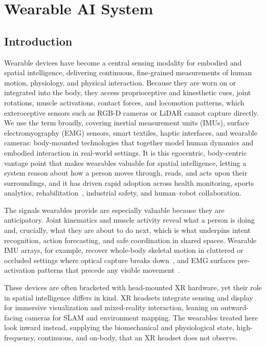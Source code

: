 
\section{Wearable AI System}
\label{sec:p4_s9_3}


\subsection{Introduction}
\label{subsec:p4-sec9-3-introduction}

Wearable devices have become a central sensing modality for embodied and spatial intelligence, delivering continuous, fine-grained measurements of human motion, physiology, and physical interaction. Because they are worn on or integrated into the body, they access proprioceptive and kinesthetic cues, joint rotations, muscle activations, contact forces, and locomotion patterns, which exteroceptive sensors such as RGB-D cameras or LiDAR cannot capture directly. We use the term broadly, covering inertial measurement units (IMUs), surface electromyography (EMG) sensors, smart textiles, haptic interfaces, and wearable cameras: body-mounted technologies that together model human dynamics and embodied interaction in real-world settings. It is this egocentric, body-centric vantage point that makes wearables valuable for spatial intelligence, letting a system reason about how a person moves through, reads, and acts upon their surroundings, and it has driven rapid adoption across health monitoring, sports analytics, rehabilitation~\cite{patel2012review}, industrial safety, and human--robot collaboration.

The signals wearables provide are especially valuable because they are anticipatory. Joint kinematics and muscle activity reveal what a person is doing and, crucially, what they are about to do next, which is what underpins intent recognition, action forecasting, and safe coordination in shared spaces. Wearable IMU arrays, for example, recover whole-body skeletal motion in cluttered or occluded settings where optical capture breaks down~\cite{huang2018dip, vonmarcard2017sparse}, and EMG surfaces pre-activation patterns that precede any visible movement~\cite{atzori2014ninapro}.

These devices are often bracketed with head-mounted XR hardware, yet their role in spatial intelligence differs in kind. XR headsets integrate sensing and display for immersive visualization and mixed-reality interaction, leaning on outward-facing cameras for SLAM and environment mapping. The wearables treated here look inward instead, supplying the biomechanical and physiological state, high-frequency, continuous, and on-body, that an XR headset does not observe.

